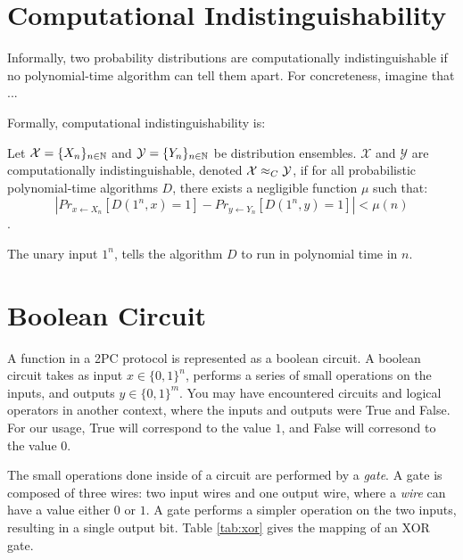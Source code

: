 \section{Computational Indistinguishability}

Informally, two probability distributions are computationally indistinguishable if no polynomial-time algorithm can tell them apart. 
For concreteness, imagine that ... 

Formally, computational indistinguishability is:

\begin{definition}
\label{defn:computational-indistinguishability}
Let $\mathcal{X} = \{X_n\}_{n \in \mathbb{N}}$ and $\mathcal{Y} = \{Y_n\}_{n \in \mathbb{N}}$ be distribution ensembles.
$\mathcal{X}$ and $\mathcal{Y}$ are computationally indistinguishable, denoted $\mathcal{X} \approx_C \mathcal{Y}$, if for all probabilistic polynomial-time algorithms $D$, there exists a negligible function $\mu$ such that:
\begin{equation}
    |Pr_{x \gets X_n} [D(1^n, x) = 1] - Pr_{y \gets Y_n} [D(1^n, y) = 1]| < \mu(n)
\end{equation}
\cite{katzlindelltextbook}.
\end{definition}

The unary input $1^n$, tells the algorithm $D$ to run in polynomial time in $n$.

\section{Boolean Circuit} 
A function in a 2PC protocol is represented as a boolean circuit.
A boolean circuit takes as input $x \in \{0,1\}^n$, performs a series of small operations on the inputs, and outputs $y \in \{0,1\}^m$.  
You may have encountered circuits and logical operators in another context, where the inputs and outputs were True and False.
For our usage, True will correspond to the value $1$, and False will corresond to the value $0$. 

The small operations done inside of a circuit are performed by a \emph{gate}.
A gate is composed of three wires: two input wires and one output wire, where a \emph{wire} can have a value either $0$ or $1$.
A gate performs a simpler operation on the two inputs, resulting in a single output bit.
Table \ref{tab:xor} gives the mapping of an XOR gate.

